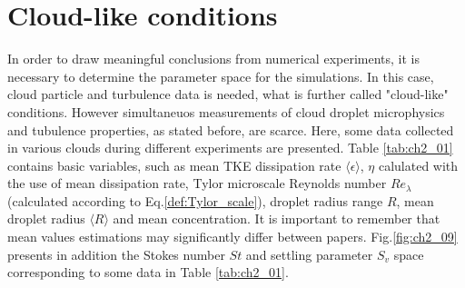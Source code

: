 \documentclass[../main.tex]{subfiles}
\begin{document}
\section{Cloud-like conditions}
\label{ch2s5}

In order to draw meaningful conclusions from numerical experiments, it is necessary to determine the parameter space for the simulations. In this case, cloud particle and turbulence data is needed, what is further called "cloud-like" conditions. However simultaneuos measurements of cloud droplet microphysics and tubulence properties, as stated before, are scarce. Here, some data collected in various clouds during different experiments are presented. Table \ref{tab:ch2_01} contains basic variables, such as mean TKE dissipation rate $\langle\epsilon\rangle$, $\eta$ calulated with the use of mean dissipation rate, Tylor microscale Reynolds number $Re_{\lambda}$ (calculated according to Eq.\ref{def:Tylor_scale}), droplet radius range $R$, mean droplet radius $\langle R \rangle$ and mean concentration. It is important to remember that mean values estimations may significantly differ between papers. Fig.\ref{fig:ch2_09} presents in addition the Stokes number $St$ and settling parameter $S_v$ space corresponding to some data in Table \ref{tab:ch2_01}.

\end{document}
